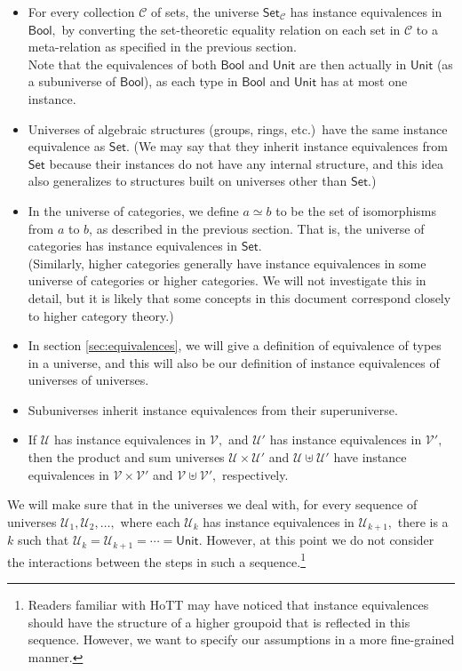 \documentclass[a4paper]{article}
\theoremstyle{definition}
\theoremstyle{remark}
\renewcommand{\equiv}{\simeq}
\newcommand{\C}{\mathcal{C}}
\newcommand{\U}{\mathcal{U}}
\newcommand{\V}{\mathcal{V}}
\newcommand{\nm}{\mathsf}
\newcommand{\universe}{\nm}
\newcommand{\Unit}{\universe{Unit}}
\newcommand{\Bool}{\universe{Bool}}
\newcommand{\Set}{\universe{Set}}
\begin{document}
\begin{itemize}
  \item For every collection $\C$ of sets, the universe $\Set_\C$ has instance equivalences
  in $\Bool,$ by converting the set-theoretic equality relation on each set in $\C$ to a
  meta-relation as specified in the previous section.\\
  Note that the equivalences of both $\Bool$ and $\Unit$ are then actually in $\Unit$ (as a
  subuniverse of $\Bool$), as each type in $\Bool$ and $\Unit$ has at most one instance.
  \item Universes of algebraic structures (groups, rings, etc.)\ have the same instance
  equivalence as $\Set.$ (We may say that they inherit instance equivalences from $\Set$
  because their instances do not have any internal structure, and this idea also generalizes
  to structures built on universes other than $\Set.$)
  \item In the universe of categories, we define $a \equiv b$ to be the set of
  isomorphisms from $a$ to $b$, as described in the previous section. That is, the
  universe of categories has instance equivalences in $\Set.$\\(Similarly, higher categories
  generally have instance equivalences in some universe of categories or higher categories.
  We will not investigate this in detail, but it is likely that some concepts in this
  document correspond closely to higher category theory.)
  \item In section \ref{sec:equivalences}, we will give a definition of equivalence of types in
  a universe, and this will also be our definition of instance equivalences of universes of
  universes.
  \item Subuniverses inherit instance equivalences from their superuniverse.
  \item If $\U$ has instance equivalences in $\V,$ and $\U'$ has instance equivalences in
  $\V',$ then the product and sum universes $\U \times \U'$ and $\U \uplus \U'$ have instance
  equivalences in $\V \times \V'$ and $\V \uplus \V',$ respectively.
\end{itemize}

We will make sure that in the universes we deal with, for every sequence of universes
$\U_1, \U_2, \ldots,$ where each $\U_k$ has instance equivalences in $\U_{k+1},$ there is
a $k$ such that $\U_k = \U_{k+1} = \cdots = \Unit.$ However, at this point we do not consider
the interactions between the steps in such a sequence.\footnote{Readers familiar with HoTT may
have noticed that instance equivalences should have the structure of a higher groupoid that is
reflected in this sequence. However, we want to specify our assumptions in a more fine-grained
manner.}
\end{document}
